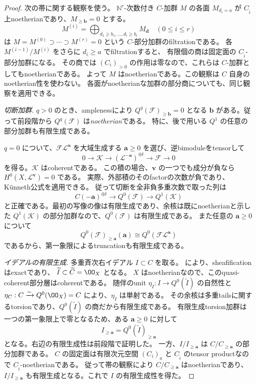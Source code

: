 \begin{proof}
 次の帯に関する観察を使う。
 \(\mathbb N^r\)-次数付き \(C\)-加群 \(M\) の各面 \(M_{d_i=a}\) が
 \(C_{\widehat i}\) 上noetherianであり、\(M_{\ge\mathbf b}=0\) とする。
 \[
 M^{(i)}=\bigoplus_{d_1\ge b_1,\ldots,d_i\ge b_i}M_{\mathbf d}
 \quad(0\le i\le r)
 \]
 は \(M=M^{(0)}\supset\cdots\supset M^{(r)}=0\) という \(C\)-部分加群のfiltrationである。
 各 \(M^{(i-1)}/M^{(i)}\) をさらに \(d_i\ge a\) でfiltrationすると、
 有限個の商は固定面の \(C_{\widehat i}\)-部分加群になる。
 その商では \((C_i)_{>0}\) の作用は零なので、これらは \(C\)-加群としてもnoetherianである。
 よって \(M\) はnoetherianである。この観察は \(C\) 自身のnoetherian性を使わない。
 各面がnoetherianな加群の部分商についても、同じ観察を適用できる。

 \emph{切断加群.}
 \(q>0\) のとき、amplenessにより \(Q^q(\mathcal F)_{\ge\mathbf b}=0\) となる
 \(\mathbf b\) がある。従って前段階から
 \(Q^q(\mathcal F)\) は\emph{noetherian}である。
 特に、後で用いる \(Q^1\) の任意の部分加群も有限生成である。

 \(q=0\) について、\(\mathcal F\mathcal L^{\mathbf a}\) を大域生成する
 \(\mathbf a\ge0\) を選び、逆bimoduleをtensorして
 \[
 0\longrightarrow\mathcal K\longrightarrow
       (\mathcal L^{-\mathbf a})^{\oplus t}
       \longrightarrow\mathcal F\longrightarrow0
 \]
 を得る。\(\mathcal K\) はcoherentである。
 この積の場合、\(\mathbf v\) の一つでも成分が負なら
 \(H^0(X,\mathcal L^{\mathbf v})=0\) である。
 実際、外部積のそのfactorの次数が負であり、K\"unneth公式を適用できる。
 従って切断を全非負多重次数で取った列は
 \[
 C(-\mathbf a)^{\oplus t}\longrightarrow Q^0(\mathcal F)
       \longrightarrow Q^1(\mathcal K)
 \]
 と正確である。最初の写像の像は有限生成であり、余核は既にnoetherianと示した
 \(Q^1(\mathcal K)\) の部分加群なので、\(Q^0(\mathcal F)\) は有限生成である。
 また任意の \(\mathbf a\ge0\) について
 \[
 Q^0(\mathcal F)_{\ge\mathbf a}(\mathbf a)
 \cong Q^0(\mathcal F\mathcal L^{\mathbf a})
 \]
 であるから、第一象限によるtruncationも有限生成である。

 \emph{イデアルの有限生成.}
 多重斉次右イデアル \(I\subset C\) を取る。
 \cite[Theorem 3.4]{ChanMulti} により、sheafificationはexactであり、
 \(\widetilde I\subset\widetilde C=\OO_X\) となる。
 \(X\) はnoetherianなので、このquasi-coherent部分層はcoherentである。
 随伴のunit \(\eta_I:I\to Q^0(\widetilde I)\) の自然性と
 \(\eta_C:C\xrightarrow{\sim}Q^0(\OO_X)=C\) により、\(\eta_I\) は単射である。
 その余核は多重tailsに関するtorsionであり、\(Q^0(\widetilde I)\) の商だから有限生成である。
 有限生成torsion加群は一つの第一象限上で零となるため、ある \(\mathbf a\ge0\) に対して
 \[
 I_{\ge\mathbf a}=Q^0(\widetilde I)_{\ge\mathbf a}
 \]
 となる。右辺の有限生成性は前段階で証明した。
 一方、\(I/I_{\ge\mathbf a}\) は \(C/C_{\ge\mathbf a}\) の部分加群である。
 \(C\) の固定面は有限次元空間 \((C_i)_a\) と \(C_{\widehat i}\) のtensor productなので
 \(C_{\widehat i}\)-noetherianである。
 従って帯の観察により \(C/C_{\ge\mathbf a}\) はnoetherianであり、
 \(I/I_{\ge\mathbf a}\) も有限生成となる。これで \(I\) の有限生成性を得た。


\end{proof}
